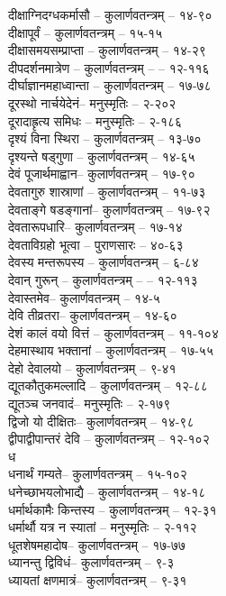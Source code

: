 \begin{raggedright}
\begin{parcolumns}[colwidths={1=.55\textwidth,2=.55\textwidth}]{2}
{दीक्षाग्निदग्धकर्मासौ	– 	कुलार्णवतन्त्रम्  – १४-९०\\
दीक्षापूर्वं	– 	कुलार्णवतन्त्रम्  – १५-१५\\
दीक्षासमयसम्प्राप्ता	– 	कुलार्णवतन्त्रम्  – १४-२९\\
दीपदर्शनमात्रेण	– 	कुलार्णवतन्त्रम्  – 	– 	१२-११६\\
दीर्घाज्ञानमहाध्वान्ता	– 	कुलार्णवतन्त्रम्  – १७-७८	\\
दूरस्थो नार्चयेदेनं– 	मनुस्मृतिः  – २-२०२\\
दूरादाह्रृत्य समिधः	– 	मनुस्मृतिः  – २-१८६\\
दृश्यं विना स्थिरा	– 	कुलार्णवतन्त्रम्  – १३-७०\\
दृश्यन्ते षड्गुणा	– 	कुलार्णवतन्त्रम्  – १४-६५\\
देवं पूजार्थमाह्वान– 	 कुलार्णवतन्त्रम्  – १७-९०\\
देवतागुरु शास्राणां	– 	कुलार्णवतन्त्रम्  – ११-७३\\
देवताङ्गे षडङ्गानां– 	 कुलार्णवतन्त्रम्  – १७-९२\\
देवतारूपधारि– 	कुलार्णवतन्त्रम्  – १७-१४\\
देवताविग्रहो भूत्वा	– 	पुराणसारः   – ४०-६३	\\
देवस्य मन्तरूपस्य	– 	कुलार्णवतन्त्रम्  – ६-८४\\
देवान् गुरून् – 	कुलार्णवतन्त्रम्  – 	–  १२-११३\\
देवास्तमेव– 	कुलार्णवतन्त्रम्  – १४-५\\
देवि तीव्रतरा– 	कुलार्णवतन्त्रम्  – १४-६०\\
देशं कालं वयो वित्तं	– 	कुलार्णवतन्त्रम्  – ११-१०४\\
देहमास्थाय भक्तानां	– 	कुलार्णवतन्त्रम्  – १७-५५\\
देहो देवालयो	– 	 कुलार्णवतन्त्रम्  – ९-४१\\
द्यूतकौतुकमल्लादि	– 	कुलार्णवतन्त्रम्  – १२-८८\\
द्यूतञ्च जनवादं– 	मनुस्मृतिः  – २-१७९\\
द्विजो यो दीक्षितः– 	कुलार्णवतन्त्रम्  – १४-९८\\
द्वीपाद्वीपान्तरं देवि	– 	कुलार्णवतन्त्रम्  – १२-१०२\\
{\large ध}\\
धनार्थं गम्यते– 	कुलार्णवतन्त्रम्  – १५-१०२\\
धनेच्छाभयलोभाद्यै	– 	कुलार्णवतन्त्रम्  – १४-१८\\
धर्मार्थकामैः किन्तस्य	– 	कुलार्णवतन्त्रम्  – १२-३१\\
धर्मार्थौ यत्र न स्यातां	– 	मनुस्मृतिः  – २-११२\\
धूतशेषमहादोष– 	 कुलार्णवतन्त्रम्  – १७-७७\\
ध्यानन्तु द्विविधं– 	कुलार्णवतन्त्रम्  – ९-३\\
ध्यायतां क्षणमात्रं– 	कुलार्णवतन्त्रम्  – ९-३१\\
}


\end{parcolumns}
\end{raggedright}
